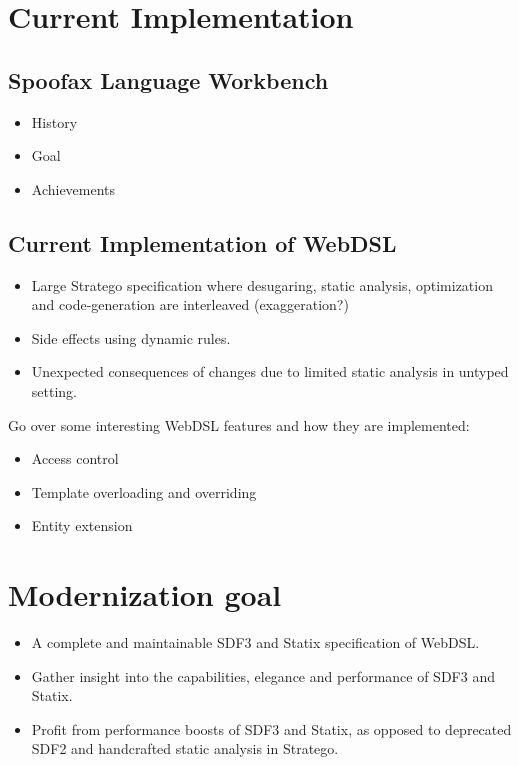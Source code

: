   \section{\label{sec:current-implementation}Current Implementation}

    \subsection{\label{subsec:spoofax}Spoofax Language Workbench}

      \begin{itemize}
        \item History
        \item Goal
        \item Achievements
      \end{itemize}

    \subsection{\label{subsec:current-implementation}Current Implementation of WebDSL}

      \begin{itemize}
        \item Large Stratego specification where desugaring, static analysis, optimization and code-generation are interleaved (exaggeration?)
        \item Side effects using dynamic rules.
        \item Unexpected consequences of changes due to limited static analysis in untyped setting.
      \end{itemize}

      Go over some interesting WebDSL features and how they are implemented:
      \begin{itemize}
        \item Access control
        \item Template overloading and overriding
        \item Entity extension
      \end{itemize}

  \section{\label{sec:modernization}Modernization goal}

    \begin{itemize}
      \item A complete and maintainable SDF3 and Statix specification of WebDSL.
      \item Gather insight into the capabilities, elegance and performance of SDF3 and Statix.
      \item Profit from performance boosts of SDF3 and Statix, as opposed to deprecated SDF2 and handcrafted static analysis in Stratego.
    \end{itemize}
